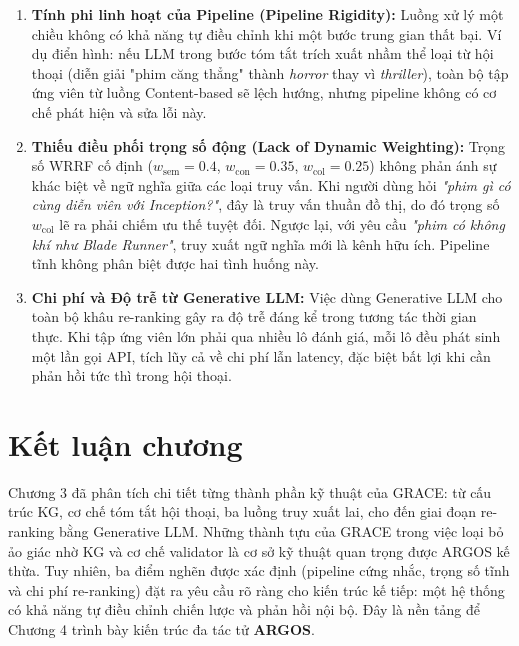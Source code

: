 \begin{enumerate}
    \item \textbf{Tính phi linh hoạt của Pipeline (Pipeline Rigidity):} Luồng xử lý một chiều không có khả năng tự điều chỉnh khi một bước trung gian thất bại. Ví dụ điển hình: nếu LLM trong bước tóm tắt trích xuất nhầm thể loại từ hội thoại (diễn giải "phim căng thẳng" thành \textit{horror} thay vì \textit{thriller}), toàn bộ tập ứng viên từ luồng Content-based sẽ lệch hướng, nhưng pipeline không có cơ chế phát hiện và sửa lỗi này.

    \item \textbf{Thiếu điều phối trọng số động (Lack of Dynamic Weighting):} Trọng số WRRF cố định ($w_{\text{sem}}=0.4$, $w_{\text{con}}=0.35$, $w_{\text{col}}=0.25$) không phản ánh sự khác biệt về ngữ nghĩa giữa các loại truy vấn. Khi người dùng hỏi \textit{"phim gì có cùng diễn viên với Inception?"}, đây là truy vấn thuần đồ thị, do đó trọng số $w_{\text{col}}$ lẽ ra phải chiếm ưu thế tuyệt đối. Ngược lại, với yêu cầu \textit{"phim có không khí như Blade Runner"}, truy xuất ngữ nghĩa mới là kênh hữu ích. Pipeline tĩnh không phân biệt được hai tình huống này.

    \item \textbf{Chi phí và Độ trễ từ Generative LLM:} Việc dùng Generative LLM cho toàn bộ khâu re-ranking gây ra độ trễ đáng kể trong tương tác thời gian thực. Khi tập ứng viên lớn phải qua nhiều lô đánh giá, mỗi lô đều phát sinh một lần gọi API, tích lũy cả về chi phí lẫn latency, đặc biệt bất lợi khi cần phản hồi tức thì trong hội thoại.
\end{enumerate}

\section*{Kết luận chương}

Chương 3 đã phân tích chi tiết từng thành phần kỹ thuật của GRACE: từ cấu trúc KG, cơ chế tóm tắt hội thoại, ba luồng truy xuất lai, cho đến giai đoạn re-ranking bằng Generative LLM. Những thành tựu của GRACE trong việc loại bỏ ảo giác nhờ KG và cơ chế validator là cơ sở kỹ thuật quan trọng được ARGOS kế thừa. Tuy nhiên, ba điểm nghẽn được xác định (pipeline cứng nhắc, trọng số tĩnh và chi phí re-ranking) đặt ra yêu cầu rõ ràng cho kiến trúc kế tiếp: một hệ thống có khả năng tự điều chỉnh chiến lược và phản hồi nội bộ. Đây là nền tảng để Chương 4 trình bày kiến trúc đa tác tử \textbf{ARGOS}.
